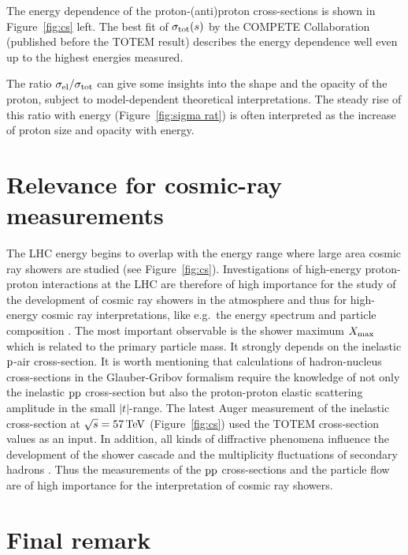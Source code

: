 \documentclass[TOTEM]{cern/cernphprep}
\def\un#1{\,{\rm #1}}
\begin{document}
The energy dependence of the proton-(anti)proton cross-sections is shown in Figure~\ref{fig:cs} left. The best fit of $\sigma_{\rm tot}(s)$ by the COMPETE Collaboration \cite{compete} (published before the TOTEM result) describes the energy dependence well even up to the highest energies measured.

The ratio $\sigma_{\rm el}/\sigma_{\rm tot}$ can give some insights into the shape and the opacity of the proton, subject to model-dependent theoretical interpretations. The steady rise of this ratio with energy (Figure~\ref{fig:sigma rat}) is often interpreted as the increase of proton size and opacity with energy. 

\FigRatio

\section{Relevance for cosmic-ray measurements}

The LHC energy begins to overlap with the energy range where large area cosmic ray showers are studied (see Figure~\ref{fig:cs}). Investigations of high-energy proton-proton interactions at the LHC are therefore of high importance for the study of the development of cosmic ray showers in the atmosphere and thus for high-energy cosmic ray interpretations, like e.g.~the energy spectrum and particle composition \cite{nagano}.  The most important observable is the shower maximum $X_{\rm max}$ which is related to the primary particle mass. It strongly depends on the inelastic $\rm p$-air cross-section. It is worth mentioning that calculations of hadron-nucleus cross-sections in the Glauber-Gribov formalism \cite{glauber,gribov} require the knowledge of not only the inelastic $\rm pp$ cross-section but also the proton-proton elastic scattering amplitude in the small $|t|$-range. The latest Auger measurement of the inelastic cross-section at $\sqrt s = 57\un{TeV}$ \cite{auger} (Figure~\ref{fig:cs}) used the TOTEM cross-section values as an input. In addition, all kinds of diffractive phenomena influence the development of the shower cascade and the multiplicity fluctuations of secondary hadrons  \cite{enterria}. Thus the measurements of the $\rm pp$ cross-sections and the particle flow are of high importance for the interpretation of cosmic ray showers.

\section{Final remark}
\end{document}
